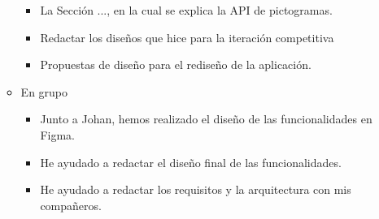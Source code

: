 \begin{itemize}
\begin{itemize}
\begin{itemize}
                        \item La Sección ..., en la cual se explica la API de pictogramas.
                        \item Redactar los diseños que hice para la iteración competitiva
                        \item Propuestas de diseño para el rediseño de la aplicación.
                    \end{itemize}
              \item En grupo
                    \begin{itemize}
                        \item Junto a Johan, hemos realizado el diseño de las funcionalidades en Figma.
                        \item He ayudado a redactar el diseño final de las funcionalidades.
                        \item He ayudado a redactar los requisitos y la arquitectura con mis compañeros.
                    \end{itemize}
          \end{itemize}
\end{itemize}

